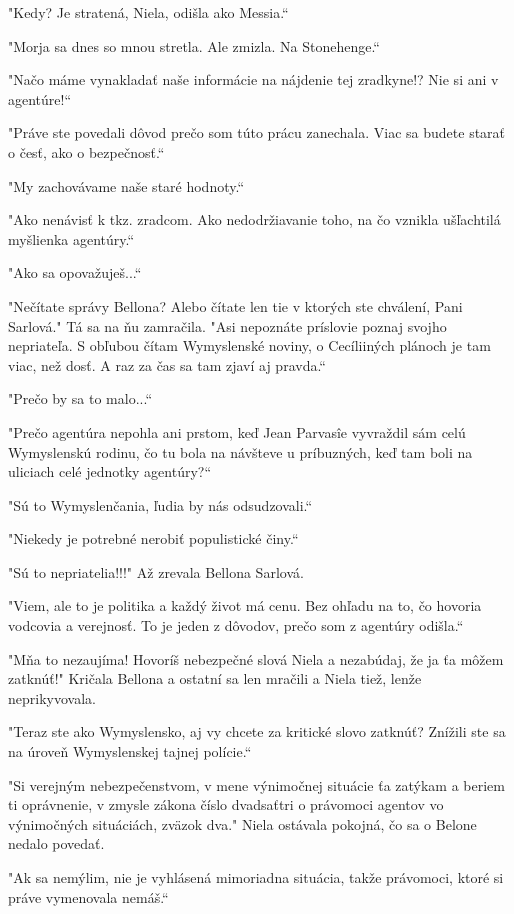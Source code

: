 \documentclass{book}
\begin{document}
"$ $Kedy? Je stratená, Niela, odišla ako Messia.“

"$ $Morja sa dnes so mnou stretla. Ale zmizla. Na Stonehenge.“

"$ $Načo máme vynakladať naše informácie na nájdenie tej zradkyne!? Nie si ani v agentúre!“

"$ $Práve ste povedali dôvod prečo som túto prácu zanechala. Viac sa budete starať o česť, ako o bezpečnosť.“

"$ $My zachovávame naše staré hodnoty.“

"$ $Ako nenávisť k tkz. zradcom. Ako nedodržiavanie toho, na čo vznikla ušľachtilá myšlienka agentúry.“

"$ $Ako sa opovažuješ...“

"$ $Nečítate správy Bellona? Alebo čítate len tie v ktorých ste chválení, Pani Sarlová."$ $ Tá sa na ňu zamračila. "$ $Asi nepoznáte príslovie poznaj svojho nepriateľa. S obľubou čítam Wymyslenské noviny, o Cecíliiných plánoch je tam viac, než dosť. A raz za čas sa tam zjaví aj pravda.“

"$ $Prečo by sa to malo...“

"$ $Prečo agentúra nepohla ani prstom, keď Jean Parvasîe vyvraždil sám celú Wymyslenskú rodinu, čo tu bola na návšteve u príbuzných, keď tam boli na uliciach celé jednotky agentúry?“

"$ $Sú to Wymyslenčania, ľudia by nás odsudzovali.“

"$ $Niekedy je potrebné nerobiť populistické činy.“

"$ $Sú to nepriatelia!!!"$ $ Až zrevala Bellona Sarlová.

"$ $Viem, ale to je politika a každý život má cenu. Bez ohľadu na to, čo hovoria vodcovia a verejnosť. To je jeden z dôvodov, prečo som z agentúry odišla.“

"$ $Mňa to nezaujíma! Hovoríš nebezpečné slová Niela a nezabúdaj, že ja ťa môžem zatknúť!"$ $ Kričala Bellona a ostatní sa len mračili a Niela tiež, lenže neprikyvovala.

"$ $Teraz ste ako Wymyslensko, aj vy chcete za kritické slovo zatknúť? Znížili ste sa na úroveň Wymyslenskej tajnej polície.“

"$ $Si verejným nebezpečenstvom, v mene výnimočnej situácie ťa zatýkam a beriem ti oprávnenie, v zmysle zákona číslo dvadsaťtri o právomoci agentov vo výnimočných situáciách, zväzok dva."$ $ Niela ostávala pokojná, čo sa o Belone nedalo povedať.

"$ $Ak sa nemýlim, nie je vyhlásená mimoriadna situácia, takže právomoci, ktoré si práve vymenovala nemáš.“
\end{document}
